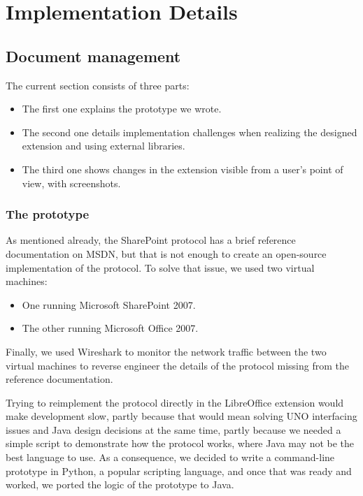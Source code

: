 \chapter{Implementation Details}

\section{Document management}

The current section consists of three parts:

\begin{itemize}
\item The first one explains the prototype we wrote.
\item The second one details implementation challenges when realizing the designed extension and using external libraries.
\item The third one shows changes in the extension visible from a user's point of view, with screenshots.
\end{itemize}

\subsection{The prototype}

As mentioned already, the SharePoint protocol has a brief reference
documentation on MSDN, but that is not enough to create an open-source
implementation of the protocol. To solve that issue, we used two virtual
machines:

\begin{itemize}
\item One running Microsoft SharePoint 2007.
\item The other running Microsoft Office 2007.
\end{itemize}

Finally, we used Wireshark \cite{wireshark} to monitor the network traffic
between the two virtual machines to reverse engineer the details of the
protocol missing from the reference documentation.

Trying to reimplement the protocol directly in the LibreOffice extension would
make development slow, partly because that would mean solving UNO interfacing
issues and Java design decisions at the same time, partly because we needed a
simple script to demonstrate how the protocol works, where Java may not be the
best language to use. As a consequence, we decided to write a command-line
prototype in Python, a popular scripting language, and once that was ready and
worked, we ported the logic of the prototype to Java.

